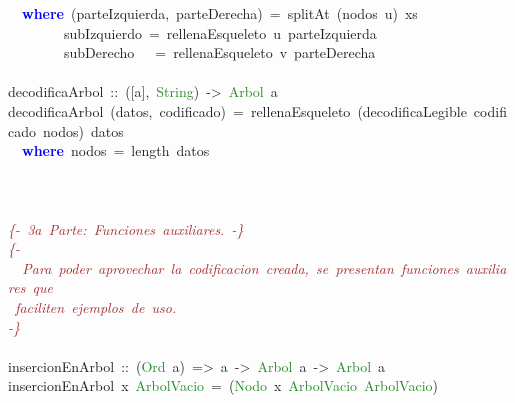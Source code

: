 \begin{allintypewriter}
\mbox{}\ \ \textbf{\textcolor{Blue}{where}}\ \textcolor{BrickRed}{(}parteIzquierda\textcolor{BrickRed}{,}\ parteDerecha\textcolor{BrickRed}{)}\ \textcolor{BrickRed}{=}\ splitAt\ \textcolor{BrickRed}{(}nodos\ u\textcolor{BrickRed}{)}\ xs \\
\mbox{}\ \ \ \ \ \ \ \ subIzquierdo\ \textcolor{BrickRed}{=}\ rellenaEsqueleto\ u\ parteIzquierda \\
\mbox{}\ \ \ \ \ \ \ \ subDerecho\ \ \ \textcolor{BrickRed}{=}\ rellenaEsqueleto\ v\ parteDerecha \\
\mbox{} \\
\mbox{}decodificaArbol\ \textcolor{BrickRed}{::}\ \textcolor{BrickRed}{([}a\textcolor{BrickRed}{],}\ \textcolor{ForestGreen}{String}\textcolor{BrickRed}{)}\ \textcolor{BrickRed}{-\textgreater{}}\ \textcolor{ForestGreen}{Arbol}\ a \\
\mbox{}decodificaArbol\ \textcolor{BrickRed}{(}datos\textcolor{BrickRed}{,}\ codificado\textcolor{BrickRed}{)}\ \textcolor{BrickRed}{=}\ rellenaEsqueleto\ \textcolor{BrickRed}{(}decodificaLegible\ codificado\ nodos\textcolor{BrickRed}{)}\ datos \\
\mbox{}\ \ \textbf{\textcolor{Blue}{where}}\ nodos\ \textcolor{BrickRed}{=}\ length\ datos \\
\mbox{}\ \ \ \ \ \ \ \  \\
\mbox{} \\
\mbox{} \\
\mbox{}\textit{\textcolor{Brown}{\{-\ 3a\ Parte:\ Funciones\ auxiliares.\ -\}}} \\
\mbox{}\textit{\textcolor{Brown}{\{-}} \\
\mbox{}\textit{\textcolor{Brown}{\ \ Para\ poder\ aprovechar\ la\ codificacion\ creada,\ se\ presentan\ funciones\ auxiliares\ que}} \\
\mbox{}\textit{\textcolor{Brown}{\ faciliten\ ejemplos\ de\ uso.}} \\
\mbox{}\textit{\textcolor{Brown}{-\}}} \\
\mbox{} \\
\mbox{}insercionEnArbol\ \textcolor{BrickRed}{::}\ \textcolor{BrickRed}{(}\textcolor{ForestGreen}{Ord}\ a\textcolor{BrickRed}{)}\ \textcolor{BrickRed}{=\textgreater{}}\ a\ \textcolor{BrickRed}{-\textgreater{}}\ \textcolor{ForestGreen}{Arbol}\ a\ \textcolor{BrickRed}{-\textgreater{}}\ \textcolor{ForestGreen}{Arbol}\ a \\
\mbox{}insercionEnArbol\ x\ \textcolor{ForestGreen}{ArbolVacio}\ \textcolor{BrickRed}{=}\ \textcolor{BrickRed}{(}\textcolor{ForestGreen}{Nodo}\ x\ \textcolor{ForestGreen}{ArbolVacio}\ \textcolor{ForestGreen}{ArbolVacio}\textcolor{BrickRed}{)} \\

\end{allintypewriter}

